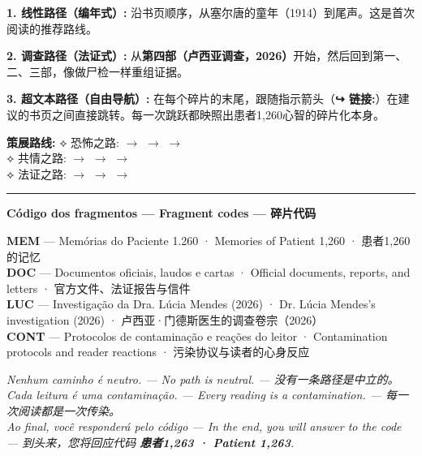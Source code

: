 \vspace{0.6em}

\noindent\textbf{1. 线性路径（编年式）:} 沿书页顺序，从塞尔唐的童年（1914）到尾声。这是首次阅读的推荐路线。

\vspace{0.4em}
\noindent\textbf{2. 调查路径（法证式）:} 从\textbf{第四部（卢西亚调查，2026）}开始，然后回到第一、二、三部，像做尸检一样重组证据。

\vspace{0.4em}
\noindent\textbf{3. 超文本路径（自由导航）:} 在每个碎片的末尾，跟随指示箭头（\textbf{↪ 链接:}）在建议的书页之间直接跳转。每一次跳跃都映照出患者1,260心智的碎片化本身。

\vspace{0.6em}

\noindent\textbf{策展路线:}
\let\trilangref\trilangrefzh
\noindent\textcolor{sangue}{⟡ 恐怖之路:}  $\rightarrow$  $\rightarrow$  $\rightarrow$ \\[0.2em]
\noindent\textcolor{sangue}{⟡ 共情之路:}  $\rightarrow$  $\rightarrow$  $\rightarrow$ \\[0.2em]
\noindent\textcolor{sangue}{⟡ 法证之路:}  $\rightarrow$  $\rightarrow$  $\rightarrow$ 

\vspace{0.8em}

\noindent\rule{\textwidth}{0.5pt}
\vspace{0.6em}

\noindent\textbf{Código dos fragmentos --- Fragment codes --- 碎片代码}

\vspace{0.3em}
\noindent\textcolor{mem}{\textbf{MEM}} --- Memórias do Paciente 1.260 · Memories of Patient 1,260 · 患者1,260的记忆\\[0.25em]
\textcolor{doc}{\textbf{DOC}} --- Documentos oficiais, laudos e cartas · Official documents, reports, and letters · 官方文件、法证报告与信件\\[0.25em]
\textcolor{luc}{\textbf{LUC}} --- Investigação da Dra. Lúcia Mendes (2026) · Dr. Lúcia Mendes's investigation (2026) · 卢西亚·门德斯医生的调查卷宗（2026）\\[0.25em]
\textcolor{cont}{\textbf{CONT}} --- Protocolos de contaminação e reações do leitor · Contamination protocols and reader reactions · 污染协议与读者的心身反应

\vspace{1.2em}
\begin{center}\itshape
Nenhum caminho é neutro. --- No path is neutral. --- 没有一条路径是中立的。\\[0.2em]
Cada leitura é uma contaminação. --- Every reading is a contamination. --- 每一次阅读都是一次传染。\\[0.6em]
\upshape Ao final, você responderá pelo código --- In the end, you will answer to the code --- 到头来，您将回应代码 \textbf{患者1,263 · Patient 1,263}.
\end{center}

\endgroup
\clearpage
